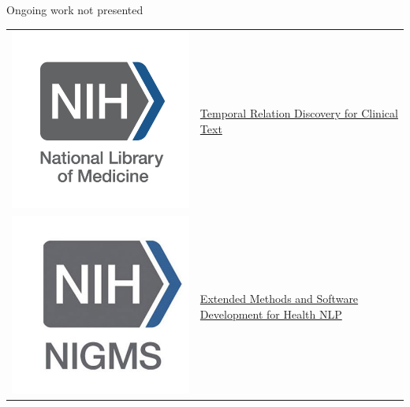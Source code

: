 \documentclass[14pt]{beamer}
\begin{document}
\begin{frame}{Ongoing work not presented}

\begin{tabular}{ @{} c p{} @{}}

\includegraphics[trim=50 50 50 50, clip, height=.1\textheight, valign=t]{nih_nlm.png}
&
\href{https://reporter.nih.gov/project-details/9735964}{Temporal Relation Discovery for Clinical Text}
\\[3ex]

\includegraphics[trim=50 50 50 50, clip, height=.1\textheight, valign=t]{nih_nigms.jpg}
&
\href{https://reporter.nih.gov/project-details/10209178}{Extended Methods and Software Development for Health NLP}
\\[4ex]


\end{tabular}
\end{frame}
\end{document}
